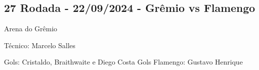 \newpage
\subsection{27 Rodada - 22/09/2024 - Grêmio vs Flamengo}

\begin{figure}[H]
    \centering
    
\end{figure}

Arena do Grêmio

Técnico: Marcelo Salles

Gols: Cristaldo, Braithwaite e Diego Costa
Gols Flamengo: Gustavo Henrique 